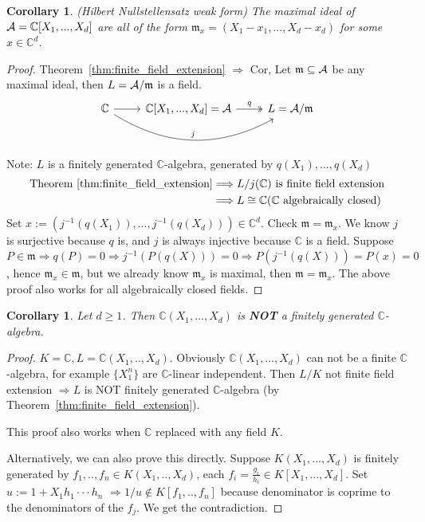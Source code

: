 \documentclass[11pt]{article}
\newtheorem{cor}[thm]{Corollary}
\newcommand{\cplx}{\mathbb C}
\newcommand{\scm}{{\mathfrak m}}
\newcommand{\cala}{{\cal A}}
\newcommand{\Lrta}{\Longrightarrow}
\begin{document}
\begin{cor}(Hilbert Nullstellensatz weak form)
The maximal ideal of $\cala=\cplx[X_1,...,X_d]$ are all of the form $\scm_x=(X_1-x_1,...,X_d-x_d)$ for some $x\in\cplx^d$.
\end{cor}
\begin{proof}
Theorem~\ref{thm:finite_field_extension} $\Lrta$ Cor, Let $\scm\subseteq \cala$ be any maximal ideal, then $ L=\cala/\scm$ is a field.
 \[
\begin{tikzcd}
\cplx\ar[r]\ar[rr,bend right,"j"]&\cplx[X_1,...,X_d]=\cala\ar[r,two heads,"q"]& L=\cala/\scm  
\end{tikzcd}
\] 
Note: $ L$ is a finitely generated $\cplx$-algebra, generated by $q(X_1),...,q(X_d)$
$$
\begin{aligned}
\text{Theorem~\ref{thm:finite_field_extension}}&\Lrta  L/j(\cplx)\text{ is finite field extension}\\
 & \Lrta
 L\cong \cplx \text{($\cplx$ algebraically closed)}
\end{aligned}
$$
Set $x:=(j^{-1}(q(X_1)),...,j^{-1}(q(X_d)))\in \cplx^d$. Check $\scm=\scm_x$.
We know $j$ is surjective because $q$ is, and $j$ is always injective because $\cplx$ is a field. Suppose $P\in \scm\Lrta q(P)=0\Lrta j^{-1}(P(q(X)))=0\Lrta P(j^{-1}(q(X)))=P(x)=0$, hence $\scm_x\in \scm$, but we already know $\scm_x$ is maximal, then $\scm=\scm_x$. The above proof also works for all algebraically closed fields.
\end{proof}

\begin{cor}\label{cor:rational_functions_not_fin.gen.alg}
Let $d\geq 1$. Then $\cplx(X_1,...,X_d)$ is \textbf{NOT} a finitely generated $\cplx$-algebra.
\end{cor}
\begin{proof}
$K=\cplx,  L=\cplx(X_1,..,X_d)$. Obviously $\cplx(X_1,...,X_d)$ can not be a finite $\cplx$-algebra, for example $\{X_1^n\}$ are $\cplx$-linear independent. Then $ L/K$ not finite field extension $\Lrta  L$ is NOT finitely generated $\cplx$-algebra (by Theorem~\ref{thm:finite_field_extension}).

This proof also works when $\cplx$ replaced with any field $K$.

Alternatively, we can also prove this directly. Suppose $K(X_1,...,X_d)$ is finitely generated by $f_1,..,f_n\in K(X_1,..,X_d)$, each $f_i=\frac{g_i}{h_i}\in K[X_1,...,X_d]$. Set $u:=1+X_1 h_1\cdot\cdot\cdot h_n$
$\Lrta 1/u\notin K[f_1,..,f_n]$ because denominator is coprime to the denominators of the $f_j$. We get the contradiction.
\end{proof}
\end{document}
